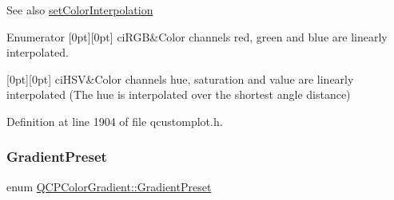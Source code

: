 \begin{DoxySeeAlso}{See also}
\hyperlink{class_q_c_p_color_gradient_aa13fda86406e1d896a465a409ae63b38}{set\+Color\+Interpolation} 
\end{DoxySeeAlso}
\begin{DoxyEnumFields}{Enumerator}
[0pt][0pt]{}\mbox{\label{class_q_c_p_color_gradient_ac5dca17cc24336e6ca176610e7f77fc1a5e30f725c9cfe93999e268a9f92afbe7}} 
ci\+R\+GB&Color channels red, green and blue are linearly interpolated. \\
\hline

[0pt][0pt]{}\mbox{\label{class_q_c_p_color_gradient_ac5dca17cc24336e6ca176610e7f77fc1af14ae62fcae11ecc07234eeaec5856cb}} 
ci\+H\+SV&Color channels hue, saturation and value are linearly interpolated (The hue is interpolated over the shortest angle distance) \\
\hline

\end{DoxyEnumFields}


Definition at line 1904 of file qcustomplot.\+h.

\mbox{\label{class_q_c_p_color_gradient_aed6569828fee337023670272910c9072}} 
\subsubsection{\texorpdfstring{Gradient\+Preset}{GradientPreset}}
{\footnotesize\ttfamily enum \hyperlink{class_q_c_p_color_gradient_aed6569828fee337023670272910c9072}{Q\+C\+P\+Color\+Gradient\+::\+Gradient\+Preset}}

